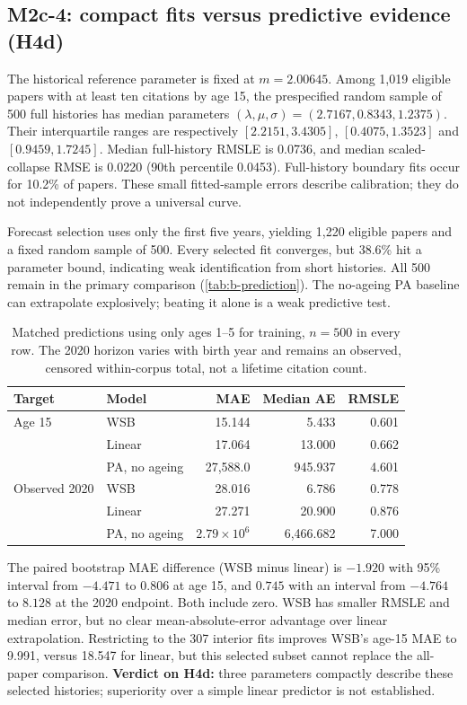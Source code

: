 \subsection{M2c-4: compact fits versus predictive evidence (H4d)}
The historical reference parameter is fixed at $m=2.00645$. Among 1,019 eligible
papers with at least ten citations by age 15, the prespecified random sample of
500 full histories has median parameters
$(\lambda,\mu,\sigma)=(2.7167,0.8343,1.2375)$.
Their interquartile ranges are respectively $[2.2151,3.4305]$,
$[0.4075,1.3523]$ and $[0.9459,1.7245]$. Median full-history RMSLE is 0.0736,
and median scaled-collapse RMSE is 0.0220 (90th percentile 0.0453).
Full-history boundary fits occur for 10.2\% of papers. These small fitted-sample
errors describe calibration; they do not independently prove a universal curve.

Forecast selection uses only the first five years, yielding 1,220 eligible papers
and a fixed random sample of 500. Every selected fit converges, but 38.6\% hit a
parameter bound, indicating weak identification from short histories. All 500
remain in the primary comparison (\autoref{tab:b-prediction}). The no-ageing PA
baseline can extrapolate explosively; beating it alone is a weak predictive test.

\begin{table}[H]
\centering
\begin{tabular}{llrrr}
\toprule
Target & Model & MAE & Median AE & RMSLE\\
\midrule
Age 15 & WSB & 15.144 & 5.433 & 0.601\\
 & Linear & 17.064 & 13.000 & 0.662\\
 & PA, no ageing & 27,588.0 & 945.937 & 4.601\\
\midrule
Observed 2020 & WSB & 28.016 & 6.786 & 0.778\\
 & Linear & 27.271 & 20.900 & 0.876\\
 & PA, no ageing & $2.79\times10^6$ & 6,466.682 & 7.000\\
\bottomrule
\end{tabular}
\caption{Matched predictions using only ages 1--5 for training, $n=500$ in every
row. The 2020 horizon varies with birth year and remains an observed, censored
within-corpus total, not a lifetime citation count.}
\label{tab:b-prediction}
\end{table}

The paired bootstrap MAE difference (WSB minus linear) is $-1.920$ with 95\%
interval from $-4.471$ to $0.806$ at age 15, and $0.745$ with an interval
from $-4.764$ to $8.128$ at the 2020 endpoint. Both include zero. WSB has smaller RMSLE
and median error, but no clear mean-absolute-error advantage over linear
extrapolation. Restricting to the 307 interior fits improves WSB's age-15 MAE to
9.991, versus 18.547 for linear, but this selected subset cannot replace the
all-paper comparison.
\textbf{Verdict on H4d:} three parameters compactly describe these selected
histories; superiority over a simple linear predictor is not established.

